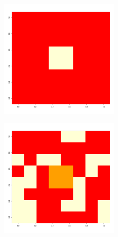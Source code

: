 \documentclass{beamer}
\begin{document}
\begin{frame}
  
\begin{figure}[h]
  \centering
\includegraphics[width=6cm]{cluster_2_64_}
\end{figure}
\end{frame}

\begin{frame}
  
\begin{figure}[h]
  \centering
\includegraphics[width=6cm]{cluster_3_64_}
\end{figure}
\end{frame}








 
\end{document}
